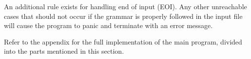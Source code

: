 An additional rule exists for handling end of input (EOI). Any other unreachable cases that should not occur if the grammar is properly followed in the input file will cause the program to panic and terminate with an error message.

Refer to the appendix for the full implementation of the main program, divided into the parts mentioned in this section.

